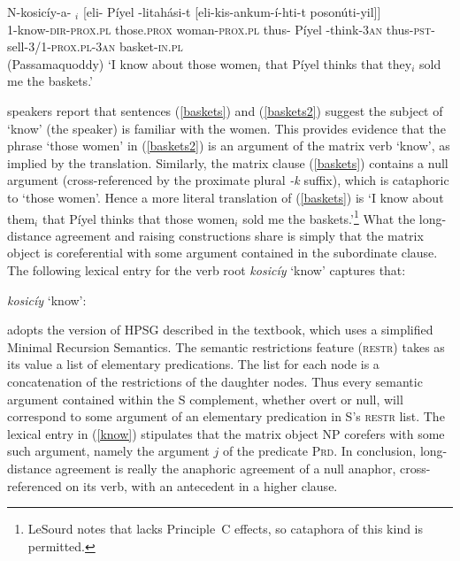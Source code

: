 \documentclass[output=paper,biblatex,babelshorthands,newtxmath,draftmode,colorlinks,citecolor=brown]{langscibook}
\begin{document}
\begin{exe}
\ex\label{baskets2}
\gll N-kosicíy-a-   $_i$ [eli- Píyel -litah\'{a}si-t  [eli-kis-ankum-í-hti-t   	{poson\'{u}ti-yil]]} \\
     1-know-\textsc{dir-prox.pl} those.\textsc{prox}  woman-\textsc{prox.pl} \spacebr{}thus- Píyel -think-\textsc{3an} \spacebr{}thus-\textsc{pst}-sell-\textsc{3/1-prox.pl-3an}         {}    basket-\textsc{in.pl}\\\hfill(Passamaquoddy)
\glt `I know about those women$_i$ that Píyel thinks that they$_i$ sold me the baskets.’
\end{exe}

\noindent
{} speakers report that sentences (\ref{baskets}) and (\ref{baskets2}) suggest the subject of `know' (the speaker) is familiar with the women.  This provides evidence that the phrase `those women' in (\ref{baskets2}) is an argument of the matrix verb `know', as implied by the translation.  
Similarly, the matrix clause (\ref{baskets}) contains a null argument (cross-referenced by the
proximate plural \textit{-k}  suffix), which is  cataphoric to `those women'.  Hence a more literal
translation of (\ref{baskets}) is `I know about them$_i$ that Píyel thinks that those women$_i$ sold
me the baskets.'\footnote{LeSourd notes that  lacks
  Principle~C effects, so cataphora of this kind is permitted.}  What the long-distance agreement and raising constructions share is simply that the matrix object is coreferential with some argument contained in the subordinate clause.  The following lexical entry for the verb root \textit{kosicíy} `know' captures that:

 \begin{exe}
\ex\label{know}
\textit{kosicíy} `know': \\
\end{exe} 

\noindent
\citeauthor{LeSourd:2018} adopts the version of HPSG described in the \citet{Sag+etal:2003}
textbook, which uses a simplified Minimal Recursion Semantics. The semantic restrictions feature
(\textsc{restr}) takes as its value a list of elementary predications.  The list for each node is a
concatenation of the restrictions of the daughter nodes.  Thus every semantic argument contained
within the S complement, whether overt or null, will correspond to some argument of an elementary
predication in S's \textsc{restr} list. The lexical entry in (\ref{know}) stipulates that the matrix
object NP corefers with some such argument, namely the argument $j$ of the predicate
\textsc{Prd}. In conclusion,  long-distance agreement is really the
anaphoric agreement of a null anaphor, cross-referenced on its verb,
with an antecedent in a higher clause.
\end{document}
